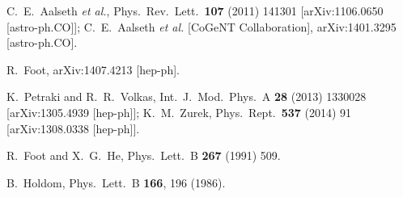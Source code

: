 \documentclass[12pt]{article}
\begin{document}
\begin{thebibliography}{999}
  C.~E.~Aalseth {\it et al.},
  Phys.\ Rev.\ Lett.\  {\bf 107} (2011) 141301
  [arXiv:1106.0650 [astro-ph.CO]];
  C.~E.~Aalseth {\it et al.}  [CoGeNT Collaboration],
  arXiv:1401.3295 [astro-ph.CO].
  
  R.~Foot,
  arXiv:1407.4213 [hep-ph].

  K.~Petraki and R.~R.~Volkas,
  Int.\ J.\ Mod.\ Phys.\ A {\bf 28} (2013) 1330028
  [arXiv:1305.4939 [hep-ph]];
  K.~M.~Zurek,
  Phys.\ Rept.\  {\bf 537} (2014) 91
  [arXiv:1308.0338 [hep-ph]].
  
  R.~Foot and X.~G.~He,
  Phys.\ Lett.\ B {\bf 267} (1991) 509.
  
  B.~Holdom,
  Phys.\ Lett.\ B {\bf 166}, 196 (1986).
  

\end{thebibliography}
\end{document}
